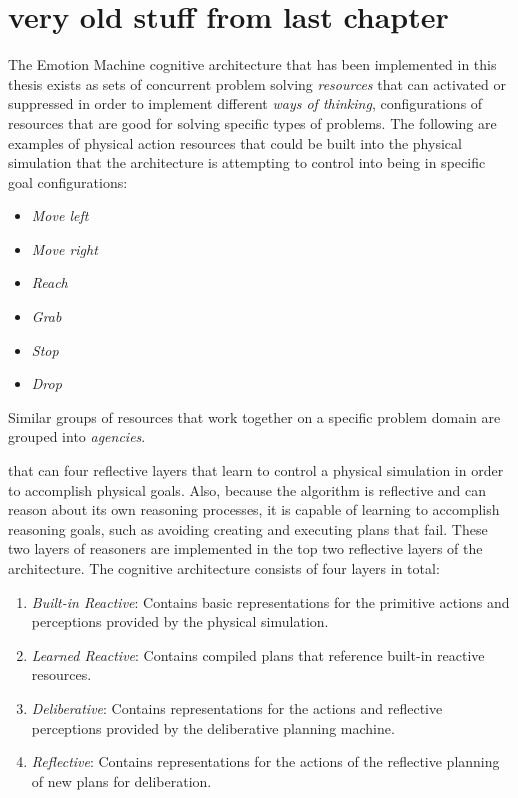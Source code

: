 \newpage
\section{very old stuff from last chapter}

The Emotion Machine cognitive architecture that has been implemented
in this thesis exists as sets of concurrent problem solving
\emph{resources} that can activated or suppressed in order to
implement different \emph{ways of thinking}, configurations of
resources that are good for solving specific types of problems.  The
following are examples of physical action resources that could be
built into the physical simulation that the architecture is attempting
to control into being in specific goal configurations:
\begin{itemize}
\item \emph{Move left}
\item \emph{Move right}
\item \emph{Reach}
\item \emph{Grab}
\item \emph{Stop}
\item \emph{Drop}
\end{itemize}


Similar groups of resources that work together on a specific problem
domain are grouped into \emph{agencies}.

that can four reflective
layers that learn to control a physical simulation in order to
accomplish physical goals.  Also, because the algorithm is reflective
and can reason about its own reasoning processes, it is capable of
learning to accomplish reasoning goals, such as avoiding creating and
executing plans that fail.  These two layers of reasoners are
implemented in the top two reflective layers of the architecture.  The
cognitive architecture consists of four layers in total:
\begin{enumerate}
\item \emph{Built-in Reactive}: Contains basic representations for the
  primitive actions and perceptions provided by the physical
  simulation.
\item \emph{Learned Reactive}: Contains compiled plans that reference
  built-in reactive resources.
\item \emph{Deliberative}: Contains representations for the actions
  and reflective perceptions provided by the deliberative planning
  machine.
\item \emph{Reflective}: Contains representations for the actions of
  the reflective planning of new plans for deliberation.
\end{enumerate}


